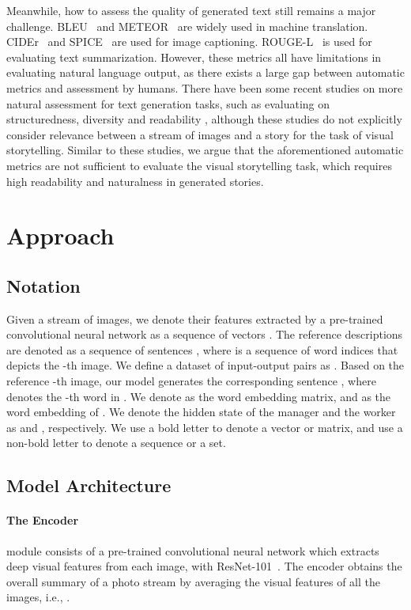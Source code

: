 \documentclass[letterpaper]{article} \usepackage{aaai20}  \usepackage{times}  \usepackage{helvet} \usepackage{courier}  \usepackage[hyphens]{url}  \usepackage{graphicx} \urlstyle{rm} \def\UrlFont{\rm}  \usepackage{graphicx}  \frenchspacing  \setlength{\pdfpagewidth}{8.5in}  \setlength{\pdfpageheight}{11in}  \usepackage{times}
\begin{document}
Meanwhile, how to assess the quality of generated text still remains a major challenge. BLEU~\cite{papineni2002bleu} and METEOR~\cite{banerjee2005meteor} are widely used in machine translation. CIDEr~\cite{vedantam2015cider} and SPICE~\cite{anderson2016spice} are used for image captioning. ROUGE-L~\cite{lin2004rouge} is used for evaluating text summarization. However, these metrics all have limitations in evaluating natural language output, as there exists a large gap between automatic metrics and assessment by humans. There have been some recent studies on more natural assessment for text generation tasks, such as evaluating on structuredness, diversity and readability \cite{plainandwrite,dai17,chen2018fast,xinwang-wenhuchen-ACL-2018}, although these studies do not explicitly consider relevance between a stream of images and a story for the task of visual storytelling. Similar to these studies, we argue that the aforementioned automatic metrics are not sufficient to evaluate the visual storytelling task, which requires high readability and naturalness in generated stories.

\section{Approach}


\subsection{Notation}
Given a stream of  images, we denote their features extracted by a pre-trained convolutional neural network as a sequence of vectors . The reference descriptions are denoted as a sequence of sentences , where  is a sequence of word indices that depicts the -th image. We define a dataset of input-output pairs as . Based on the reference -th image, our model generates the corresponding sentence , where  denotes the -th word in . We denote  as the word embedding matrix, and  as the word embedding of . We denote the hidden state of the manager and the worker as  and , respectively. We use a bold letter to denote a vector or matrix, and use a non-bold letter to denote a sequence or a set.

\subsection{Model Architecture}
\label{sec:model}
\paragraph{The Encoder} module consists of a pre-trained convolutional neural network which extracts deep visual features from each image, with ResNet-101~\cite{he2016deep}. The encoder obtains the overall summary of a photo stream by averaging the visual features of all the images, i.e., .
\end{document}
